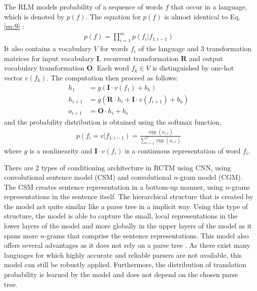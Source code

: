 \documentclass[12pt]{extarticle}
\begin{document}
The RLM models probability of a sequence of words $f$ that occur in a language, which is denoted by $p(f)$. The equation for $p(f)$ is almost identical to Eq. \ref{eq:9} :
\begin{align}
p(f) = \prod_{i=1}^{m} p(f_{i}|f_{1:i-1})
\end{align}
It also contains a vocabulary $V$ for words $f_{i}$ of the language and 3 transformation matrices for input vocabulary $\textbf{I}$, recurrent transformation $\textbf{R}$ and output vocabulary transformation $\textbf{O}$. Each word $f_{k} \in V$ is distinguished by one-hot vector $v(f_{k})$. The computation then proceed as follows: 
\begin{align}
h_{1} &= g(\textbf{I} \cdot v(f_{1}) + b_{h}) \\
h_{i+1} &= g(\textbf{R} \cdot h_{i} + \textbf{I} \cdot v(f_{i+1}) + b_{h}) \\
o_{i+1} &= \textbf{O} \cdot h_{i} + b_{o}
\end{align}
and the probability distribution is obtained using the softmax function, 
\begin{align}
p(f_{i} = v | f_{1:i-1}) = \frac{\exp(o_{i,v})}{\sum_{v=1}^{V}\exp(o_{i,v})}
\end{align}
where $g$ is a nonlinearity and $\textbf{I} \cdot v(f_{i})$ is a continuous representation of word $f_{i}$.

There are 2 types of conditioning architecture in RCTM using CNN, using convolutional sentence model (CSM) and convolutional $n$-gram model (CGM). The CSM creates sentence representation in a bottom-up manner, using $n$-grams representations in the sentence itself. The hierarchical structure that is created by the model act quite similar like a parse tree in a implicit way. Using this type of structure, the model is able to capture the small, local representations in the lower layers of the model and more globally in the upper layers of the model as it spans more $n$-grams that comprise the sentence representations. This model also offers several advantages as it does not rely on a parse tree \citep{Grefenstette:2011:CSS:2002669.2002683, Socher:2012:SCT:2390948.2391084}. As there exist many languages for which highly accurate and reliable parsers are not available, this model can still be robustly applied. Furthermore, the distribution of translation probability is learned by the model and does not depend on the chosen parse tree.
\end{document}
